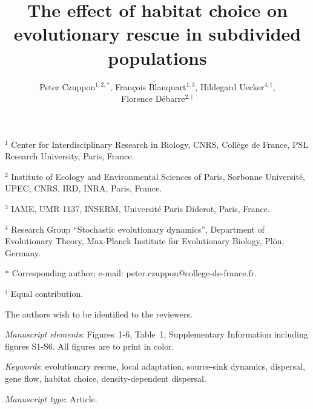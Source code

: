 \documentclass[a4paper,11pt]{article}
\title{The effect of habitat choice on evolutionary rescue in subdivided populations}
\author{Peter Czuppon$^{1,2,\ast}$, Fran\c{c}ois Blanquart$^{1,3}$, Hildegard Uecker$^{4,\dag}$,\\ Florence D\'{e}barre$^{2,\dag}$}
\date{}
\begin{document}
\maketitle

\vspace{-20pt}
\noindent $^1$ Center for Interdisciplinary Research in Biology, CNRS, Coll\`ege de France, PSL Research University, Paris, France.

\noindent $^2$ Institute of Ecology and Environmental Sciences of Paris, Sorbonne Universit\'e, UPEC, CNRS, IRD, INRA, Paris, France.

\noindent $^3$ IAME, UMR 1137, INSERM, Universit\'{e} Paris Diderot, Paris, France.

\noindent $^4$ Research Group ``Stochastic evolutionary dynamics'', Department of Evolutionary Theory, Max-Planck Institute for Evolutionary Biology, Pl\"{o}n, Germany.

\noindent $\ast$ Corresponding author; e-mail: peter.czuppon@college-de-france.fr.

\noindent $^\dag$ Equal contribution.

\noindent The authors wish to be identified to the reviewers.

\bigskip

\textit{Manuscript elements}: Figures~1-6, Table~1, Supplementary Information including figures S1-S6. All figures are to print in color.

\bigskip

\textit{Keywords}: evolutionary rescue, local adaptation, source-sink dynamics, dispersal, gene flow, habitat choice, density-dependent dispersal.

\bigskip

\textit{Manuscript type}: Article. %

\newpage

\linenumbers{}
\modulolinenumbers[2]
\end{document}
